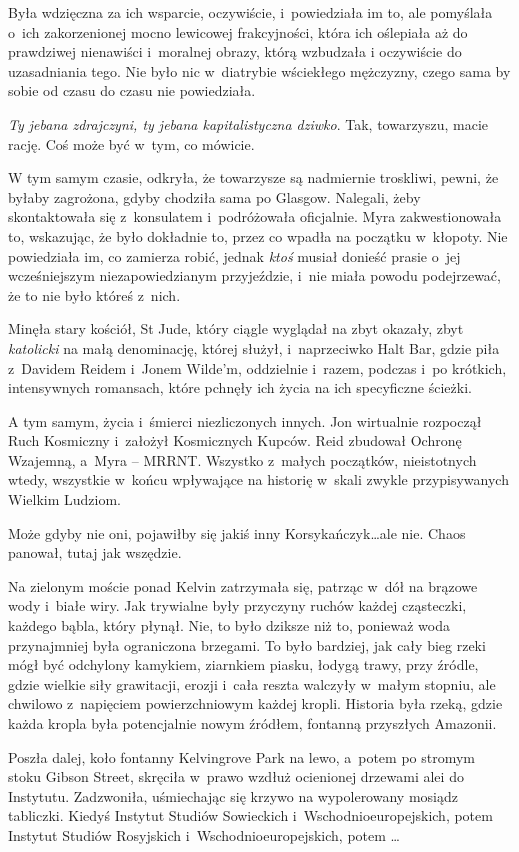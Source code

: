 \documentclass[oneside,polish,11pt,sfheadings]{mwbk}
\begin{document}
Była wdzięczna za ich wsparcie, oczywiście, i~powiedziała im to, ale
pomyślała o~ich zakorzenionej mocno lewicowej frakcyjności, która ich
oślepiała aż do prawdziwej nienawiści i~moralnej obrazy, którą wzbudzała
i oczywiście do uzasadniania tego. Nie było nic w~diatrybie wściekłego
mężczyzny, czego sama by sobie od czasu do czasu nie powiedziała.

\textit{Ty jebana zdrajczyni, ty jebana kapitalistyczna dziwko}. Tak,
towarzyszu, macie rację. Coś może być w~tym, co mówicie.

W tym samym czasie, odkryła, że towarzysze są nadmiernie troskliwi,
pewni, że byłaby zagrożona, gdyby chodziła sama po Glasgow. Nalegali,
żeby skontaktowała się z~konsulatem i~podróżowała oficjalnie. Myra
zakwestionowała to, wskazując, że było dokładnie to, przez co wpadła na
początku w~kłopoty. Nie powiedziała im, co zamierza robić, jednak
\textit{ktoś} musiał donieść prasie o~jej wcześniejszym niezapowiedzianym
przyjeździe, i~nie miała powodu podejrzewać, że to nie było któreś z~nich.

Minęła stary kościół, St Jude, który ciągle wyglądał na zbyt okazały,
zbyt \textit{katolicki} na małą denominację, której służył, i~naprzeciwko
Halt Bar, gdzie piła z~Davidem Reidem i~Jonem Wilde'm, oddzielnie i~razem, podczas i~po krótkich, intensywnych romansach, które pchnęły ich
życia na ich specyficzne ścieżki.

A tym samym, życia i~śmierci niezliczonych innych. Jon wirtualnie
rozpoczął Ruch Kosmiczny i~założył Kosmicznych Kupców. Reid zbudował
Ochronę Wzajemną, a~Myra -- MRRNT. Wszystko z~małych początków,
nieistotnych wtedy, wszystkie w~końcu wpływające na historię w~skali
zwykle przypisywanych Wielkim Ludziom.

Może gdyby nie oni, pojawiłby się jakiś inny Korsykańczyk\ldots ale nie.
Chaos panował, tutaj jak wszędzie.

Na zielonym moście ponad Kelvin zatrzymała się, patrząc w~dół na brązowe
wody i~białe wiry. Jak trywialne były przyczyny ruchów każdej
cząsteczki, każdego bąbla, który płynął. Nie, to było dziksze niż to,
ponieważ woda przynajmniej była ograniczona brzegami. To było bardziej,
jak cały bieg rzeki mógł być odchylony kamykiem, ziarnkiem piasku,
łodygą trawy, przy źródle, gdzie wielkie siły grawitacji, erozji i~cała
reszta walczyły w~małym stopniu, ale chwilowo z~napięciem
powierzchniowym każdej kropli. Historia była rzeką, gdzie każda kropla
była potencjalnie nowym źródłem, fontanną przyszłych Amazonii.

Poszła dalej, koło fontanny Kelvingrove Park na lewo, a~potem po stromym
stoku Gibson Street, skręciła w~prawo wzdłuż ocienionej drzewami alei do
Instytutu. Zadzwoniła, uśmiechając się krzywo na wypolerowany mosiądz
tabliczki. Kiedyś Instytut Studiów Sowieckich i~Wschodnioeuropejskich,
potem Instytut Studiów Rosyjskich i~Wschodnioeuropejskich, potem \ldots
\end{document}
